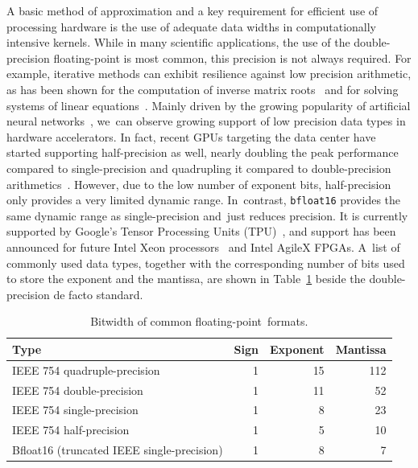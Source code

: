 \documentclass[computation,article,accept,moreauthors,pdftex]{Definitions/mdpi}
\begin{document}
A basic method of approximation and a key requirement for efficient use of processing hardware is the use of adequate data widths in computationally intensive kernels. While in many scientific applications, the use of the double-precision floating-point is most common, this precision is not always required.
For example, iterative methods can exhibit resilience against low precision arithmetic, as has been shown for the computation of inverse matrix roots~\cite{lass17-esl} and for solving systems of linear equations~\cite{KlavikMalossiBekasEtAl2014,Bekas,Dongarra2017,Dongarra2018}.
Mainly driven by the growing popularity of artificial neural networks~\cite{Gupta2015}, we~can observe growing support of low precision data types
in hardware accelerators.
In fact, recent GPUs targeting the data center have started supporting half-precision as well, nearly doubling the peak performance compared to single-precision and quadrupling it compared to double-precision arithmetics~\cite{tesla}. However, due to the low number of exponent bits, half-precision only provides a very limited dynamic range. In~contrast, \texttt{bfloat16} %
 provides the same dynamic range as single-precision and~just reduces precision. It is currently supported by Google's Tensor Processing Units (TPU)~\cite{tpu}, and support has been announced for future Intel Xeon processors~\cite{xeon} and Intel AgileX FPGAs. A~list of commonly used data types, together with the corresponding number of bits used to store the exponent and the mantissa, are shown in Table~\ref{tab:float} beside the double-precision {de facto} standard. 

\begin{table}[H]
 \caption{Bitwidth of common floating-point~formats.}
 \centering
 \label{tab:float}
 \begin{tabular}{lrrr}
 \toprule
 \textbf{Type} & \textbf{Sign} & \textbf{Exponent} & \textbf{Mantissa} \\
 \midrule
 IEEE 754 quadruple-precision & 1 & 15 & 112 \\
 IEEE 754 double-precision & 1 & 11 & 52 \\
 IEEE 754 single-precision & 1 & 8 & 23 \\
 IEEE 754 half-precision & 1 & 5 & 10 \\
 Bfloat16%
 (truncated IEEE single-precision) & 1 & 8 & 7\\
 \bottomrule
 \end{tabular}
\end{table}
\end{document}
